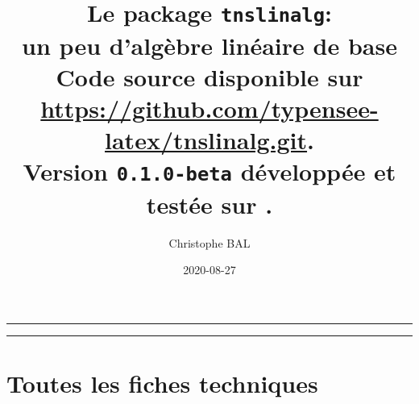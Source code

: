 \documentclass[12pt,a4paper]{article}
\begin{document}
\renewcommand\labelitemi{\raisebox{0.125em}{\tiny\textbullet}}
\renewcommand{\labelitemii}{---}

\title{  %
	Le package \texttt{tnslinalg}:\\%
	un peu d'algèbre linéaire de base\\%
	{\footnotesize Code source disponible sur \url{https://github.com/typensee-latex/tnslinalg.git}.}\\%
{\footnotesize Version \texttt{0.1.0-beta} développée et testée sur \macosxname{}.}%
}
\author{Christophe BAL}
\date{2020-08-27}

\maketitle


\vspace{2em}

\hrule

\tableofcontents

\vspace{1.5em}

\hrule

\newpage



\newpage
\section{Toutes les fiches techniques} \label{techincal-ids}

\end{document}
